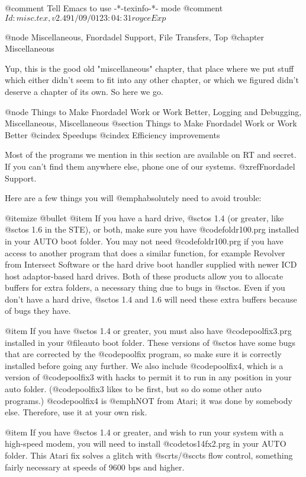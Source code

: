@comment Tell Emacs to use -*-texinfo-*- mode
@comment $Id: misc.tex,v 2.4 91/09/01 23:04:31 royce Exp $

@node Miscellaneous, Fnordadel Support, File Transfers, Top
@chapter Miscellaneous

Yup, this is the good old "miscellaneous" chapter, that place
where we put stuff which either didn't seem to fit into any other chapter,
or which we figured didn't deserve a chapter of its own.  So here we go.

@node Things to Make Fnordadel Work or Work Better, Logging and Debugging, Miscellaneous, Miscellaneous
@section Things to Make Fnordadel Work or Work Better
@cindex Speedups
@cindex Efficiency improvements

Most of the programs we mention in this section are available on RT and
secret.  If you can't find them anywhere else, phone one of our systems.
@xref{Fnordadel Support}.

Here are a few things you will @emph{absolutely need} to avoid trouble:

@itemize @bullet
@item
If you have a hard drive, @sc{tos} 1.4 (or greater, like @sc{tos} 1.6 in the
STE), or both, make sure you have @code{foldr100.prg} installed in your
AUTO boot folder.  You may not need @code{foldr100.prg} if you have access
to another program that does a similar function, for example
Revolver from Intersect Software or the hard drive boot handler
supplied with newer ICD host adaptor-based hard drives.  Both of
these products allow you to allocate buffers for extra folders,
a necessary thing due to bugs in @sc{tos}.  Even if you don't have a
hard drive, @sc{tos} 1.4 and 1.6 will need these extra buffers because of
bugs they have.

@item
If you have @sc{tos} 1.4 or greater, you must also have @code{poolfix3.prg}
installed in your @file{auto} boot folder.  These versions of @sc{tos} have
some bugs that are corrected by the @code{poolfix} program, so make sure
it is correctly installed before going any further.  We also include
@code{poolfix4}, which is a version of @code{poolfix3} with hacks to
permit it to run in any position in your auto folder.  (@code{poolfix3} likes
to be first, but so do some other auto programs.)  @code{poolfix4} is
@emph{NOT} from Atari; it was done by somebody else.  Therefore, use it at
your own risk.

@item
If you have @sc{tos} 1.4 or greater, and wish to run your system with a
high-speed modem, you will need to install @code{tos14fx2.prg} in your
AUTO folder.  This Atari fix solves a glitch with @sc{rts}/@sc{cts} flow
control, something fairly necessary at speeds of 9600 bps and higher.

